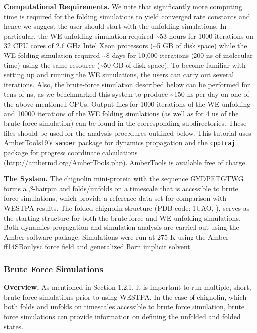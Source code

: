 \documentclass[9pt,tutorial,pubversion]{livecoms}
\begin{document}
\textbf{Computational Requirements.} We note that significantly more computing time is required for the folding simulations to yield converged rate constants and hence we suggest the user should start with the unfolding simulations. 
In particular, the WE unfolding simulation required \textasciitilde 53 hours for 1000 iterations on 32 CPU cores of 2.6 GHz Intel Xeon processors (\textasciitilde 5 GB of disk space) while the WE folding simulation required \textasciitilde 8 days for 10,000 iterations (200 ns of molecular time) using the same resource (\textasciitilde 50 GB of disk space).
To become familiar with setting up and running the WE simulations, the users can carry out several iterations.  Also, the brute-force simulation described below can be performed for tens of ns, as we benchmarked this system to produce \textasciitilde 150 ns per day on one of the above-mentioned CPUs. Output files for 1000 iterations of the WE unfolding and 10000 iterations of the WE folding simulations (as well as for 4 us of the brute-force simulation) can be found in the corresponding subdirectories. These files should be used for the analysis procedures outlined below.
This tutorial uses AmberTools19’s \verb|sander| package for dynamics propagation and the  \verb|cpptraj| package for progress coordinate calculations (\url{http://ambermd.org/AmberTools.php}). 
AmberTools is available free of charge.

\textbf{The System.} The chignolin mini-protein with the sequence GYDPETGTWG forms a $\beta$-hairpin and folds/unfolds on a timescale that is accessible to brute force simulations, which provide a reference data set for comparison with WESTPA results. 
The folded chignolin structure (PDB code: 1UAO, \citep{Honda2004}), serves as the starting structure for both the brute-force and WE unfolding simulations. 
Both dynamics propagation and simulation analysis are carried out using the Amber software package. 
Simulations were run at 275 K using the Amber ff14SBonlysc force field \citep{ff} and generalized Born implicit solvent \citep{implicit_solvent}. 

\subsubsection{Brute Force Simulations}

\textbf{Overview.} As mentioned in Section 1.2.1, it is important to run multiple, short, brute force simulations prior to using WESTPA. 
In the case of chignolin, which both folds and unfolds on timescales accessible to brute force simulation, brute force simulations can provide information on defining the unfolded and folded states. 
 
\end{document}
